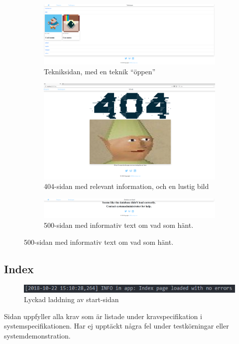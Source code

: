 \documentclass{TDP003mall}
\begin{document}
\begin{figure}[H]
\begin{subfigure}[b]{0.49\textwidth}
        \label{fig:projectpage}
    \end{subfigure}
    \hfill
    \begin{subfigure}[b]{0.49\textwidth}
        \includegraphics[width=\textwidth, frame]{techniquespage.png}
        \caption{Tekniksidan, med en teknik \enquote{öppen}}
        \label{fig:techniquespage}
    \end{subfigure}
    \hfill
    \begin{subfigure}[b]{0.49\textwidth}
        \includegraphics[width=\textwidth, frame]{404page.png}
        \caption{404-sidan med relevant information, och en lustig bild}
        \label{fig:404page}
    \end{subfigure}    
    \hfill
    \begin{subfigure}[b]{0.49\textwidth}
        \includegraphics[width=\textwidth, frame]{500page.png}
        \caption{500-sidan med informativ text om vad som hänt.}
        \label{fig:500page}
    \end{subfigure} 
    \label{fig:pagepictures}
\end{figure}
\newpage
\subsection{Index}
\begin{figure}[H]
    \centering
    \includegraphics[width=\linewidth]{index.png}
    \caption{Lyckad laddning av start-sidan}
    \label{fig:index}
\end{figure}
Sidan uppfyller alla krav som är listade under kravspecifikation i systemspecifikationen.
Har ej upptäckt några fel under testkörningar eller systemdemonstration.
\end{document}

